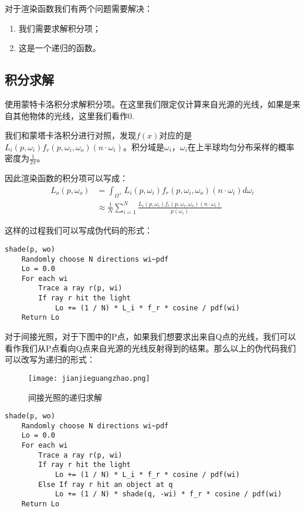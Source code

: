\documentclass[openany]{progbookcn}
\begin{document}
对于渲染函数我们有两个问题需要解决：
\begin{enumerate}
	\item 我们需要求解积分项；
	\item 这是一个递归的函数。
\end{enumerate}

\subsection{积分求解}

使用蒙特卡洛积分求解积分项。在这里我们限定仅计算来自光源的光线，如果是来自其他物体的光线，这里我们看作0.

我们和蒙塔卡洛积分进行对照，发现$f(x)$对应的是$L_i(p,\omega_i)f_r(p,\omega_i,\omega_o)(n\cdot \omega_i)$。积分域是$\omega_i$，$\omega_i$在上半球均匀分布采样的概率密度为$\frac{1}{2\pi}$。

因此渲染函数的积分项可以写成：
\begin{equation}
	\begin{split}
		L_o(p,\omega_o)&=\int_{\Omega^+}L_i(p,\omega_i)f_r(p,\omega_i,\omega_o)(n\cdot \omega_i)d\omega_i\\
		&\approx \frac{1}{N}\sum_{i=1}^{N}\frac{L_i(p,\omega_i)f_r(p,\omega_i,\omega_o)(n\cdot \omega_i)}{p(\omega_i)}
	\end{split}
\end{equation}

这样的过程我们可以写成伪代码的形式：
\begin{lstlisting}[caption=渲染函数积分项对光源光线求解伪代码]
shade(p, wo)
	Randomly choose N directions wi~pdf
	Lo = 0.0
	For each wi
		Trace a ray r(p, wi)
		If ray r hit the light
			Lo += (1 / N) * L_i * f_r * cosine / pdf(wi)
	Return Lo
\end{lstlisting}

对于间接光照，对于下图中的P点，如果我们想要求出来自Q点的光线，我们可以看作我们从P点看向Q点来自光源的光线反射得到的结果。那么以上的伪代码我们可以改写为递归的形式：


\begin{figure}[H]
	\centering
	\texttt{[image: jianjieguangzhao.png]}
	\caption{间接光照的递归求解}
	\label{fig:jjgz}
\end{figure}

\begin{lstlisting}[caption=渲染函数积分项的递归求解伪代码]
shade(p, wo)
	Randomly choose N directions wi~pdf
	Lo = 0.0
	For each wi
		Trace a ray r(p, wi)
		If ray r hit the light
			Lo += (1 / N) * L_i * f_r * cosine / pdf(wi)
		Else If ray r hit an object at q
			Lo += (1 / N) * shade(q, -wi) * f_r * cosine / pdf(wi)
	Return Lo
\end{lstlisting}
\end{document}

